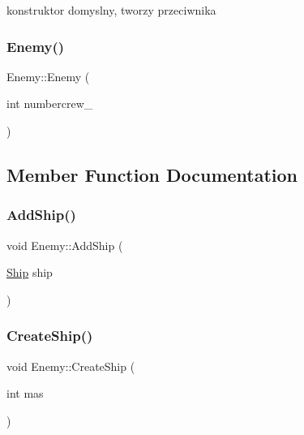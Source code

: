 konstruktor domyslny, tworzy przeciwnika 

\mbox{\label{class_enemy_abaf7fffe0200056c76228d6e27904e40}} 
\subsubsection{\texorpdfstring{Enemy()}{Enemy()}\hspace{0.1cm}{\footnotesize\ttfamily [2/2]}}
{\footnotesize\ttfamily Enemy\+::\+Enemy (\begin{DoxyParamCaption}\item[{int}]{numbercrew\+\_\+ }\end{DoxyParamCaption})\hspace{0.3cm}{\ttfamily [inline]}}



\subsection{Member Function Documentation}
\mbox{\label{class_enemy_ad876e376e71d068698bcc7656b68f753}} 
\subsubsection{\texorpdfstring{Add\+Ship()}{AddShip()}}
{\footnotesize\ttfamily void Enemy\+::\+Add\+Ship (\begin{DoxyParamCaption}\item[{\hyperlink{class_ship}{Ship}}]{ship }\end{DoxyParamCaption})}

\mbox{\label{class_enemy_aaadffa4aee876d722b821fe2588ed0ae}} 
\subsubsection{\texorpdfstring{Create\+Ship()}{CreateShip()}}
{\footnotesize\ttfamily void Enemy\+::\+Create\+Ship (\begin{DoxyParamCaption}\item[{int}]{mas }\end{DoxyParamCaption})}



